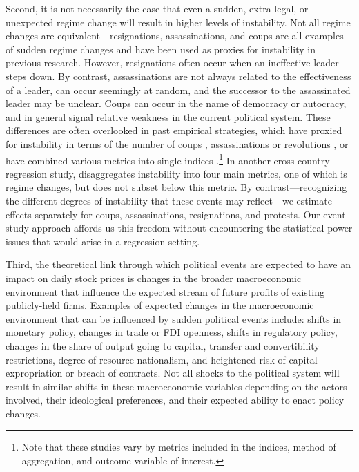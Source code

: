 \documentclass[12pt,final,fleqn]{article}
\theoremstyle{plain}
\begin{document}
Second, it is not necessarily the case that even a sudden, extra-legal, or unexpected regime change will result in higher levels of instability. Not all regime changes are equivalent---resignations, assassinations, and coups are all examples of sudden regime changes and have been used as proxies for instability in previous research. However, resignations often occur when an ineffective leader steps down. By contrast, assassinations are not always related to the effectiveness of a leader, can occur seemingly at random, and the successor to the assassinated leader may be unclear. Coups can occur in the name of democracy or autocracy, and in general signal relative weakness in the current political system. These differences are often overlooked in past empirical strategies, which have proxied for instability in terms of the number of coups \citep{londregan1990poverty, alesina1996political}, assassinations or revolutions \citep{barro1991economic}, or have combined various metrics into single indices \citep{alesina1996income, venieris1986income, gupta1990economics}.\footnote{Note that these studies vary by metrics included in the indices, method of aggregation, and outcome variable of interest.} In another cross-country regression study, \citet{jong2009measurement} disaggregates instability into four main metrics, one of which is regime changes, but does not subset below this metric. By contrast---recognizing the different degrees of instability that these events may reflect---we estimate effects separately for coups, assassinations, resignations, and protests. Our event study approach affords us this freedom without encountering the statistical power issues that would arise in a regression setting.

Third, the theoretical link through which political events are expected to have an impact on daily stock prices is changes in the broader macroeconomic environment that influence the expected stream of future profits of existing publicly-held firms. Examples of expected changes in the macroeconomic environment that can be influenced by sudden political events include: shifts in monetary policy, changes in trade or FDI openness, shifts in regulatory policy, changes in the share of output going to capital, transfer and convertibility restrictions, degree of resource nationalism, and heightened risk of capital expropriation or breach of contracts. Not all shocks to the political system will result in similar shifts in these macroeconomic variables depending on the actors involved, their ideological preferences, and their expected ability to enact policy changes.
\end{document}
